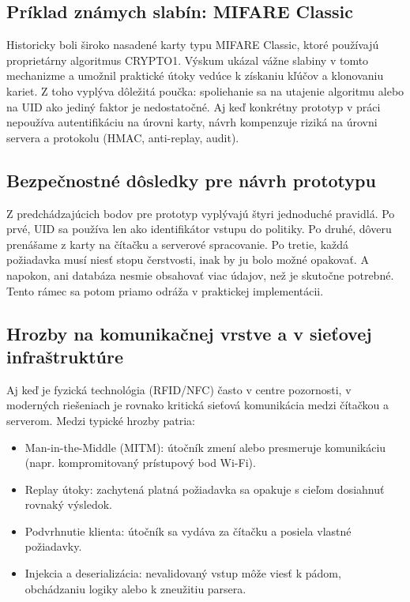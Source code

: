 \documentclass[journal,a4paper,onecolumn]{IEEEtran}
\begin{document}
\subsection{Príklad známych slabín: MIFARE Classic}

Historicky boli široko nasadené karty typu MIFARE Classic, ktoré používajú proprietárny algoritmus CRYPTO1. Výskum ukázal vážne slabiny v tomto mechanizme a umožnil praktické útoky vedúce k získaniu kľúčov a klonovaniu kariet. Z toho vyplýva dôležitá poučka: spoliehanie sa na utajenie algoritmu alebo na UID ako jediný faktor je nedostatočné. Aj keď konkrétny prototyp v práci nepoužíva autentifikáciu na úrovni karty, návrh kompenzuje riziká na úrovni servera a protokolu (HMAC, anti-replay, audit).

\subsection{Bezpečnostné dôsledky pre návrh prototypu}

Z predchádzajúcich bodov pre prototyp vyplývajú štyri jednoduché pravidlá. Po prvé, UID sa používa len ako identifikátor vstupu do politiky. Po druhé, dôveru prenášame z karty na čítačku a serverové spracovanie. Po tretie, každá požiadavka musí niesť stopu čerstvosti, inak by ju bolo možné opakovať. A napokon, ani databáza nesmie obsahovať viac údajov, než je skutočne potrebné. Tento rámec sa potom priamo odráža v praktickej implementácii.


\subsection{Hrozby na komunikačnej vrstve a v sieťovej infraštruktúre}

Aj keď je fyzická technológia (RFID/NFC) často v centre pozornosti, v moderných riešeniach je rovnako kritická sieťová komunikácia medzi čítačkou a serverom. Medzi typické hrozby patria:

\begin{itemize}[leftmargin=*,itemsep=2pt]
  \item Man-in-the-Middle (MITM): útočník zmení alebo presmeruje komunikáciu (napr. kompromitovaný prístupový bod Wi-Fi).
  \item Replay útoky: zachytená platná požiadavka sa opakuje s cieľom dosiahnuť rovnaký výsledok.
  \item Podvrhnutie klienta: útočník sa vydáva za čítačku a posiela vlastné požiadavky.
  \item Injekcia a deserializácia: nevalidovaný vstup môže viesť k pádom, obchádzaniu logiky alebo k zneužitiu parsera.
\end{itemize}
\end{document}
